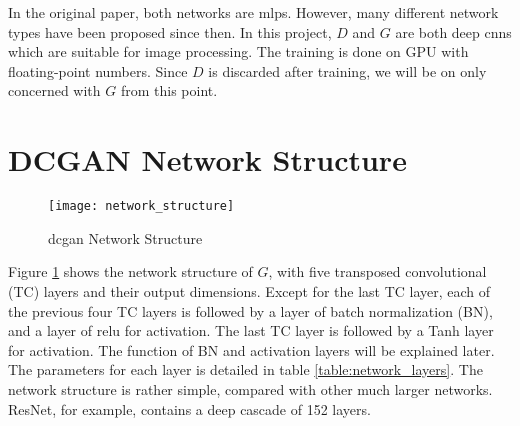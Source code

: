 In the original paper, both networks are \glspl{mlp}. However, many different network types have been
proposed since then. In this project, $D$ and $G$ are both deep \glspl{cnn} \cite{radford:conv_gan}
which are suitable for image processing. The training is done on GPU with floating-point numbers. Since $D$ is
discarded after training, we will be on only concerned with $G$ from this point.

\section{DCGAN Network Structure}

\begin{figure}[h]
  \centering
  \texttt{[image: network\_structure]}
  \caption{\gls{dcgan} \cite{radford:conv_gan} Network Structure}
  \label{fig:network_structure}
\end{figure}

Figure \ref{fig:network_structure} shows the network structure of $G$, with five transposed convolutional (TC)
layers and their output dimensions. Except for the last TC layer, each of the previous four TC layers is
followed by a layer of batch normalization (BN), and a layer of \gls{relu} for activation. The last TC layer
is followed by a Tanh layer for activation. The function of BN and activation layers will be explained later.
The parameters for each layer is detailed in table \ref{table:network_layers}. The network structure is
rather simple, compared with other much larger networks. ResNet, for example, contains a deep cascade of
152 layers.

